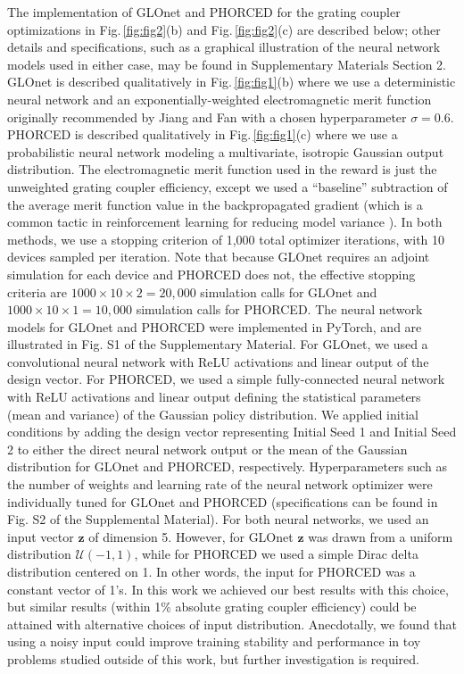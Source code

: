 \documentclass{article}
\begin{document}
The implementation of GLOnet and PHORCED for the grating coupler optimizations in Fig.\,\ref{fig:fig2}(b) and Fig.\,\ref{fig:fig2}(c) are described below; other details and specifications, such as a graphical illustration of the neural network models used in either case, may be found in Supplementary Materials Section 2. GLOnet is described qualitatively in Fig.\,\ref{fig:fig1}(b) where we use a deterministic neural network and an exponentially-weighted electromagnetic merit function originally recommended by Jiang and Fan \cite{jiang_global_2019,jiang_simulator-based_2020} with a chosen hyperparameter $\sigma=0.6$. PHORCED is described qualitatively in Fig.\,\ref{fig:fig1}(c) where we use a probabilistic neural network modeling a multivariate, isotropic Gaussian output distribution. The electromagnetic merit function used in the reward is just the unweighted grating coupler efficiency, except we used a ``baseline'' subtraction of the average merit function value in the backpropagated gradient (which is a common tactic in reinforcement learning for reducing model variance \cite{sutton2018reinforcement}). In both methods, we use a stopping criterion of 1,000 total optimizer iterations, with 10 devices sampled per iteration. Note that because GLOnet requires an adjoint simulation for each device and PHORCED does not, the effective stopping criteria are $1000\times10\times2=20,000$ simulation calls for GLOnet and $1000\times10\times1=10,000$ simulation calls for PHORCED. The neural network models for GLOnet and PHORCED were implemented in PyTorch, and are illustrated in Fig. S1 of the Supplementary Material. For GLOnet, we used a convolutional neural network with ReLU activations and linear output of the design vector. For PHORCED, we used a simple fully-connected neural network with ReLU activations and linear output defining the statistical parameters (mean and variance) of the Gaussian policy distribution. We applied initial conditions by adding the design vector representing Initial Seed 1 and Initial Seed 2 to either the direct neural network output or the mean of the Gaussian distribution for GLOnet and PHORCED, respectively. Hyperparameters such as the number of weights and learning rate of the neural network optimizer were individually tuned for GLOnet and PHORCED (specifications can be found in Fig. S2 of the Supplemental Material). For both neural networks, we used an input vector $\mathbf{z}$ of dimension 5. However, for GLOnet $\mathbf{z}$ was drawn from a uniform distribution $\mathcal{U}(-1,1)$, while for PHORCED we used a simple Dirac delta distribution centered on 1. In other words, the input for PHORCED was a constant vector of 1's. In this work we achieved our best results with this choice, but similar results (within 1\% absolute grating coupler efficiency) could be attained with alternative choices of input distribution. Anecdotally, we found that using a noisy input could improve training stability and performance in toy problems studied outside of this work, but further investigation is required.  
\end{document}
